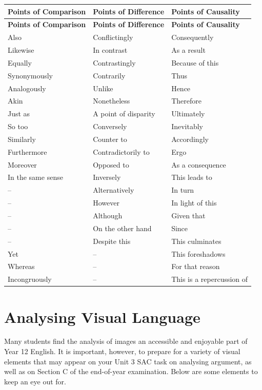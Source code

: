 \documentclass[a4paper]{article}
\begin{document}
\begin{longtable}{|p{4cm}|p{4cm}|p{6cm}|}
\hline
\textbf{Points of Comparison} & \textbf{Points of Difference} & \textbf{Points of Causality} \\
\hline
\endfirsthead

\hline
\textbf{Points of Comparison} & \textbf{Points of Difference} & \textbf{Points of Causality} \\
\hline
\endhead

Also & Conflictingly & Consequently \\
Likewise & In contrast & As a result \\
Equally & Contrastingly & Because of this \\
Synonymously & Contrarily & Thus \\
Analogously & Unlike & Hence \\
Akin & Nonetheless & Therefore \\
Just as & A point of disparity & Ultimately \\
So too & Conversely & Inevitably \\
Similarly & Counter to & Accordingly \\
Furthermore & Contradictorily to & Ergo \\
Moreover & Opposed to & As a consequence \\
In the same sense & Inversely & This leads to \\
-- & Alternatively & In turn \\
-- & However & In light of this \\
-- & Although & Given that \\
-- & On the other hand & Since \\
-- & Despite this & This culminates \\
Yet & -- & This foreshadows \\
Whereas & -- & For that reason \\
Incongruously & -- & This is a repercussion of \\
\hline

\end{longtable}


\newpage

\section{Analysing Visual Language}
Many students find the analysis of images an accessible and enjoyable part of Year 12 English. It is important, however, to prepare for a variety of visual elements that may appear on your Unit 3 SAC task on analysing argument, as well as on Section C of the end-of-year examination. Below are some elements to keep an eye out for.
\end{document}
